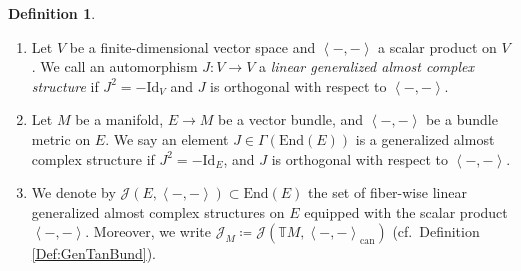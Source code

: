 \documentclass[12pt,a4paper]{article}
\theoremstyle{plain}
\theoremstyle{definition}
\newtheorem{definition}[theorem]{Definition}
\newcommand{\scal}[2]{\left\langle #1,#2\right\rangle}
\newcommand{\GenTM}{\mathbb TM}
\newcommand{\Jcal}{\mathcal{J}}
\begin{document}
\begin{definition}
\begin{enumerate}
    \item Let $V$ be a finite-dimensional vector space and $\scal{-}{-}$ a scalar product on $V$. We call an automorphism $J:V\to V$ a \textit{linear generalized almost complex structure} if $J^2=-\mathrm{Id}_V$ and $J$ is orthogonal with respect to $\scal{-}{-}$.
    \item Let $M$ be a manifold, $E\to M$ be a vector bundle, and $\scal{-}{-}$ be a bundle metric on $E$. We say an element $J\in \Gamma(\mathrm{End}(E))$ is a generalized almost complex structure if $J^2=-\mathrm{Id}_E$, and $J$ is orthogonal with respect to $\scal{-}{-}$.
    \item We denote by $\Jcal(E,\scal{-}{-})\subset \mathrm{End}(E)$ the set of fiber-wise linear generalized almost complex structures on $E$ equipped with the scalar product $\scal{-}{-}$. Moreover, we write $\Jcal_M\coloneqq \Jcal(\GenTM,\scal{-}{-}_{\mathrm{can}})$ (cf.~Definition \ref{Def:GenTanBund}).
\end{enumerate}
\end{definition}
\end{document}
